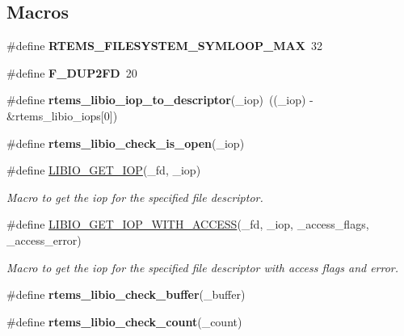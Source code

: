 \subsection*{Macros}
\begin{DoxyCompactItemize}
\item 
\mbox{\label{group__LibIOInternal_gac9ecdea8034a8dbf743b1e7499699f31}} 
\#define {\bfseries R\+T\+E\+M\+S\+\_\+\+F\+I\+L\+E\+S\+Y\+S\+T\+E\+M\+\_\+\+S\+Y\+M\+L\+O\+O\+P\+\_\+\+M\+AX}~32
\item 
\mbox{\label{group__LibIOInternal_ga417847d58eee169adb7bbf4e0990fffe}} 
\#define {\bfseries F\+\_\+\+D\+U\+P2\+FD}~20
\item 
\mbox{\label{group__LibIOInternal_ga276d747d15a8a5086b154421d111887d}} 
\#define {\bfseries rtems\+\_\+libio\+\_\+iop\+\_\+to\+\_\+descriptor}(\+\_\+iop)~((\+\_\+iop) -\/ \&rtems\+\_\+libio\+\_\+iops\mbox{[}0\mbox{]})
\item 
\#define {\bfseries rtems\+\_\+libio\+\_\+check\+\_\+is\+\_\+open}(\+\_\+iop)
\item 
\#define \mbox{\hyperlink{group__LibIOInternal_gae8da391ba86b1fc626eca3a7f3e9fada}{L\+I\+B\+I\+O\+\_\+\+G\+E\+T\+\_\+\+I\+OP}}(\+\_\+fd,  \+\_\+iop)
\begin{DoxyCompactList}\small\item\em Macro to get the iop for the specified file descriptor. \end{DoxyCompactList}\item 
\#define \mbox{\hyperlink{group__LibIOInternal_ga0abd228f2daccda438cb45d17c76f3ca}{L\+I\+B\+I\+O\+\_\+\+G\+E\+T\+\_\+\+I\+O\+P\+\_\+\+W\+I\+T\+H\+\_\+\+A\+C\+C\+E\+SS}}(\+\_\+fd,  \+\_\+iop,  \+\_\+access\+\_\+flags,  \+\_\+access\+\_\+error)
\begin{DoxyCompactList}\small\item\em Macro to get the iop for the specified file descriptor with access flags and error. \end{DoxyCompactList}\item 
\#define {\bfseries rtems\+\_\+libio\+\_\+check\+\_\+buffer}(\+\_\+buffer)
\item 
\#define {\bfseries rtems\+\_\+libio\+\_\+check\+\_\+count}(\+\_\+count)
\item 
\mbox{\label{group__LibIOInternal_ga42fc31fb87854235be4e58278ef08a3b}} 

\end{DoxyCompactItemize}

